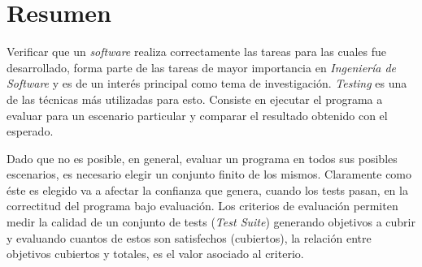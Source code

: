 \chapter*{Resumen}
Verificar que un \emph{software} realiza correctamente las tareas para las cuales fue desarrollado, forma parte de las tareas de mayor importancia en \emph{Ingenier\'ia de Software} y es de un inter\'es principal como tema de investigaci\'on. \emph{Testing} es una de las t\'ecnicas m\'as utilizadas para esto. Consiste en ejecutar el programa a evaluar para un escenario particular y comparar el resultado obtenido con el esperado.


Dado que no es posible, en general, evaluar un programa en todos sus posibles escenarios, es necesario elegir un conjunto finito de los mismos. Claramente como \'este es elegido va a afectar la confianza que genera, cuando los tests pasan, en la correctitud del programa bajo evaluaci\'on. Los criterios de evaluaci\'on permiten medir la calidad de un conjunto de tests (\emph{Test Suite}) generando objetivos a cubrir y evaluando cuantos de estos son satisfechos (cubiertos), la relaci\'on entre objetivos cubiertos y totales, es el valor asociado al criterio.



